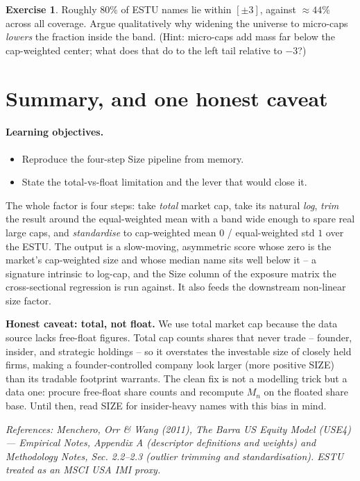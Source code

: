 \documentclass[11pt]{article}
\theoremstyle{definition}
\newtheorem{exercise}{Exercise}[section]
\theoremstyle{plain}
\theoremstyle{remark}
\begin{document}
\begin{exercise}
Roughly $80\%$ of ESTU names lie within $[\pm 3]$, against $\approx 44\%$ across all coverage. Argue qualitatively why widening the universe to micro-caps \emph{lowers} the fraction inside the band. (Hint: micro-caps add mass far below the cap-weighted center; what does that do to the left tail relative to $-3$?)
\end{exercise}

\section{Summary, and one honest caveat}\label{sec:summary}

\paragraph{Learning objectives.}
\begin{itemize}[leftmargin=1.4em,topsep=2pt,itemsep=1pt]
  \item Reproduce the four-step Size pipeline from memory.
  \item State the total-vs-float limitation and the lever that would close it.
\end{itemize}

The whole factor is four steps: take \emph{total} market cap, take its natural \emph{log}, \emph{trim} the result around the equal-weighted mean with a band wide enough to spare real large caps, and \emph{standardise} to cap-weighted mean $0$ / equal-weighted std $1$ over the ESTU. The output is a slow-moving, asymmetric score whose zero is the market's cap-weighted size and whose median name sits well below it -- a signature intrinsic to log-cap, and the Size column of the exposure matrix the cross-sectional regression is run against. It also feeds the downstream non-linear size factor.

\begin{pitfall}
\textbf{Honest caveat: total, not float.} We use total market cap because the data source lacks free-float figures. Total cap counts shares that never trade -- founder, insider, and strategic holdings -- so it overstates the investable size of closely held firms, making a founder-controlled company look larger (more positive SIZE) than its tradable footprint warrants. The clean fix is not a modelling trick but a data one: procure free-float share counts and recompute $M_n$ on the floated share base. Until then, read SIZE for insider-heavy names with this bias in mind.
\end{pitfall}

\begin{center}\small\itshape
References: Menchero, Orr \& Wang (2011), \textit{The Barra US Equity Model (USE4)} --- Empirical Notes, Appendix A (descriptor definitions and weights) and Methodology Notes, Sec. 2.2--2.3 (outlier trimming and standardisation). ESTU treated as an MSCI USA IMI proxy.
\end{center}
\end{document}
